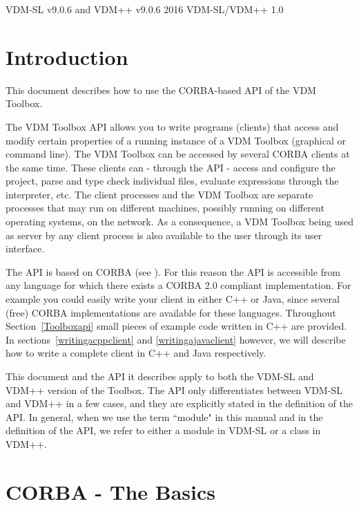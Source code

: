 \documentclass[\pformat,12pt]{article}
\begin{document}
       {VDM-SL v9.0.6 and VDM++ v9.0.6}
       {2016}
       {VDM-SL/VDM++}
       {1.0}

\renewcommand{\thepage}{\roman{page}}

\label{endtofc}
\ifthenelse{\isodd{\pageref{endtofc}}}{\mbox{}\newpage}{}
\newpage 
\renewcommand{\thepage}{\arabic{page}}
\setcounter{page}{1}


\section{Introduction}
This document describes how to use the CORBA-based API of the VDM Toolbox. 

The VDM Toolbox API allows you to write programs (clients) that access
and modify certain properties of a running instance of a VDM
Toolbox (graphical or command line). The
VDM Toolbox can be accessed by several CORBA clients at the same time.
These clients can - through the API - access and configure the
project, parse and type check individual files, evaluate expressions
through the interpreter, etc. The client processes and the VDM Toolbox
are separate processes that may run on different machines, possibly
running on different operating systems, on the network. As a
consequence, a VDM Toolbox being used as server by any client process
is also available to the user through its user interface.

The API is based on CORBA (see \cite{OMG&96}). For this reason the API is
accessible from any language for which there exists a CORBA
2.0 compliant implementation. For example you could easily write your client in
either C++ or Java, since several (free) CORBA implementations are
available for these languages. Throughout Section~\ref{Toolboxapi}
small pieces of example code written in C++ are provided. In
sections~\ref{writingacppclient} and \ref{writingajavaclient} however,
we will describe how to write a complete client in C++ and Java
respectively. 

This document and the API it describes apply to both the VDM-SL and
VDM++ version of the Toolbox. The API only differentiates between
VDM-SL and VDM++ in a few cases, and they are explicitly stated in the
definition of the API. In general, when we use the term ``module" in
this manual and in the definition of the API, we refer to either a
module in VDM-SL or a class in VDM++.   

\newpage
\section{CORBA - The Basics}
\end{document}
